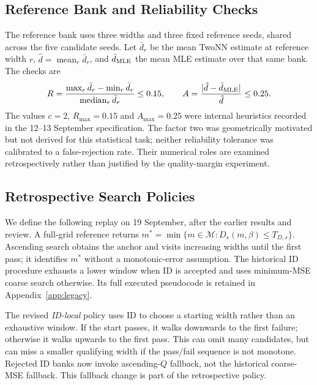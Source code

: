 \subsection{Reference Bank and Reliability Checks}\label{sec:algorithm}
The reference bank uses three widths and
three fixed reference seeds, shared across the five candidate seeds.
Let $\bar d_r$ be the mean TwoNN estimate at reference width $r$,
$\hat d=\operatorname{mean}_r\bar d_r$, and $\bar d_{\rm MLE}$ the mean
MLE estimate over that same bank. The checks are
\begin{equation}
 R=\frac{\max_r\bar d_r-\min_r\bar d_r}{\operatorname{median}_r\bar d_r}
 \le0.15,\qquad
 A=\frac{|\hat d-\bar d_{\rm MLE}|}{\hat d}\le0.25.
 \label{eq:checks}
\end{equation}
The values $c=2$, $R_{\max}=0.15$ and $A_{\max}=0.25$ were internal
heuristics recorded in the 12--13 September specification. The factor
two was geometrically motivated but not derived for this statistical
task; neither reliability tolerance was calibrated to a false-rejection
rate. Their numerical roles are examined retrospectively rather than
justified by the quality-margin experiment.

\subsection{Retrospective Search Policies}\label{sec:replay}
We define the following replay on 19 September, after the earlier
results and review. A full-grid reference returns
$m^*=\min\{m\in\mathcal M:D_s(m,\beta)\le T_{D,s}\}$.
Ascending search obtains the anchor and visits increasing widths until
the first pass; it identifies $m^*$ without a monotonic-error assumption.
The historical ID procedure exhausts a lower window when ID is accepted
and uses minimum-MSE coarse search otherwise. Its full executed
pseudocode is retained in Appendix~\ref{app:legacy}.

The revised \emph{ID-local} policy uses ID to choose a starting width
rather than an exhaustive window. If the start passes, it walks
downwards to the first failure; otherwise it walks upwards to the first
pass. This can omit many candidates, but can miss a smaller qualifying
width if the pass/fail sequence is not monotone. Rejected ID banks now
invoke ascending-$Q$ fallback, not the historical coarse-MSE fallback.
This fallback change is part of the retrospective policy.

